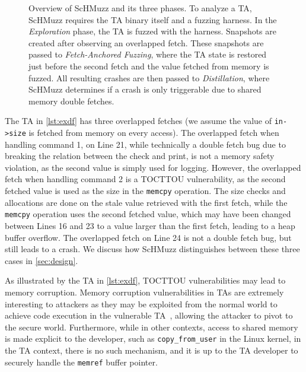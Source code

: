 \documentclass[conference]{IEEEtran}
\newcommand{\sysname}{ScHMuzz\xspace}
\newcommand{\stageone}{Exploration\xspace}
\newcommand{\stagetwo}{Fetch-Anchored Fuzzing\xspace}
\newcommand{\stagethree}{Distillation\xspace}
\begin{document}
\begin{figure}[h!]
  \centering
  
  \caption{
    Overview of \sysname and its three phases. To analyze a TA, \sysname requires the TA binary itself 
	and a fuzzing harness. In the \emph{\stageone} phase, the TA is fuzzed with the harness. Snapshots 
	are created after observing an overlapped fetch. These snapshots are passed to \emph{\stagetwo}, 
	where the TA state is restored just before the second fetch and the value fetched from memory is fuzzed. All resulting crashes 
    are then passed to \emph{\stagethree}, where \sysname determines if a crash is only triggerable 
	due to shared memory double fetches.
    }
  \label{fig:overview}
\end{figure}

The TA in \autoref{lst:exdf} has three overlapped fetches (we assume the value of \texttt{in->size} is fetched from memory 
on every access). The overlapped
fetch when handling command 1, on Line 21, while technically a double fetch bug due to breaking the relation 
between the check and print, is not a memory safety violation, as the second value is simply 
used for logging. However, the overlapped fetch when handling command 2 is a TOCTTOU vulnerability, as the 
second fetched value is used as the size in the \texttt{memcpy} operation. The size checks and allocations are done on the 
stale value retrieved with the first fetch, while the \texttt{memcpy} operation uses the second fetched 
value, which may have been changed between Lines 16 and 23 to a value larger than 
the first fetch, leading to a heap buffer overflow. The overlapped fetch on Line 24 is not a 
double fetch bug, but still leads to a crash. We discuss how \sysname distinguishes between 
these three cases in \autoref{sec:design}.

As illustrated by the TA in \autoref{lst:exdf}, TOCTTOU vulnerabilities may lead to memory 
corruption. Memory corruption vulnerabilities in TAs are extremely interesting 
to attackers as they may be exploited from the normal world to achieve code execution 
in the vulnerable TA~\cite{fiasccco,beniaini2017trustissues,berard2018kinibi,busch2020finding,rollback,globalconfusion,Komaromy2021UnboxYourPhone,Li2024DiveIntoAndroidTA,AdamskiGuilbonPeterlin2019SamsungTrustZone,Makkaveev2019TrustZoneFuzzing,AdamTC}, allowing the attacker to pivot to the secure world.
Furthermore, while in other contexts, access to shared memory is made explicit to 
the developer, such as \texttt{copy\_from\_user} in the Linux kernel, in the TA 
context, there is no such mechanism, and it is up to the TA developer to securely  
handle the \texttt{memref} buffer pointer. 
\end{document}
